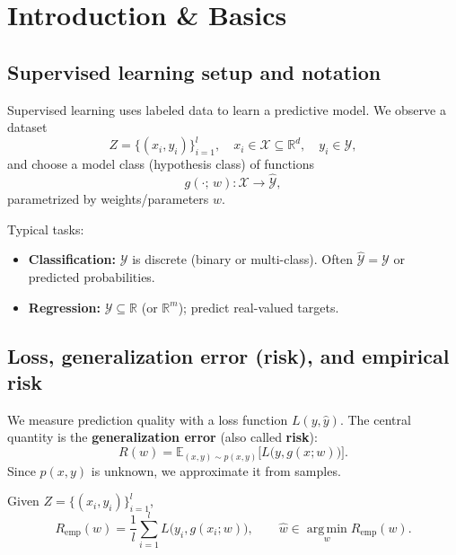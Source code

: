 \documentclass[11pt, oneside]{book}
\newcommand{\R}{\mathbb{R}}
\newcommand{\E}{\mathbb{E}}              %
\newcommand{\argmin}{\operatorname*{arg\,min}}
\newcommand{\1}{\ind}                       %
\begin{document}
\setcounter{tocdepth}{2}

\begingroup
  \let\cleardoublepage\relax
  \let\clearpage\relax
  \tableofcontents
\endgroup

\mainmatter  %


\chapter{Introduction \& Basics}

\section{Supervised learning setup and notation}
Supervised learning uses labeled data to learn a predictive model.
We observe a dataset
\[
  Z = \{(x_i,y_i)\}_{i=1}^l,\quad x_i\in\mathcal{X}\subseteq\R^d,\quad y_i\in\mathcal{Y},
\]
and choose a model class (hypothesis class) of functions
\[
  g(\cdot;\,w):\mathcal{X}\to \hat{\mathcal{Y}},
\]
parametrized by weights/parameters $w$.

Typical tasks:
\begin{itemize}
  \item \textbf{Classification:} $\mathcal{Y}$ is discrete (binary or multi-class). Often $\hat{\mathcal{Y}}=\mathcal{Y}$ or predicted probabilities.
  \item \textbf{Regression:} $\mathcal{Y}\subseteq\R$ (or $\R^m$); predict real-valued targets.
\end{itemize}

\section{Loss, generalization error (risk), and empirical risk}
We measure prediction quality with a loss function $L(y,\hat y)$.
The central quantity is the \textbf{generalization error} (also called \textbf{risk}):
\[
  R(w)=\E_{(x,y)\sim p(x,y)}\Big[L\big(y, g(x;w)\big)\Big].
\]
Since $p(x,y)$ is unknown, we approximate it from samples.

\begin{thmbox}[title={Empirical Risk Minimization (ERM)}]
Given $Z=\{(x_i,y_i)\}_{i=1}^l$,
\[
R_{\mathrm{emp}}(w)=\frac{1}{l}\sum_{i=1}^{l} L\big(y_i, g(x_i;w)\big),
\qquad
\hat w \in \argmin_w R_{\mathrm{emp}}(w).
\]
\end{thmbox}
\end{document}
